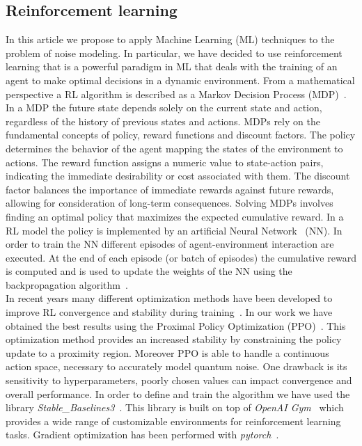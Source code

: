 \documentclass[sn-basic]{sn-jnl} %
\begin{document}
\subsection{Reinforcement learning}\label{sec_rl}
In this article we propose to apply Machine Learning (ML) techniques to the problem of noise modeling.
In particular, we have decided to use reinforcement learning that is a powerful paradigm in ML that deals with the training of an agent to make 
optimal decisions in a dynamic environment. From a mathematical perspective a RL algorithm is described as a Markov Decision Process (MDP)~\cite{PUTERMAN1990331}. 
In a MDP the future state depends solely on the current state and action, regardless of the history of previous states and actions. 
MDPs rely on the fundamental concepts of policy, reward functions and discount factors. 
The policy determines the behavior of the agent mapping the states of the environment to actions. 
The reward function assigns a numeric value to state-action pairs, indicating the immediate desirability or cost associated with them. 
The discount factor balances the importance of immediate rewards against future rewards, allowing for consideration of long-term consequences. 
Solving MDPs involves finding an optimal policy that maximizes the expected cumulative reward.
In a RL model the policy is implemented by an artificial Neural Network~\cite{Zou2009} (NN). 
In order to train the NN different episodes of agent-environment interaction are executed. 
At the end of each episode (or batch of episodes) the cumulative reward is computed and is used to update the weights of the NN using the backpropagation 
algorithm~\cite{Rojas1996}.\\
In recent years many different optimization methods have been developed to improve RL convergence and stability during training~\cite{ozalp2020}. 
In our work we have obtained the best results using the Proximal Policy Optimization (PPO)~\cite{schulman2017proximal}. 
This optimization method provides an increased stability by constraining the policy update to a proximity region. 
Moreover PPO is able to handle a continuous action space, necessary to accurately model quantum noise. 
One drawback is its sensitivity to hyperparameters, poorly chosen values can impact convergence and overall performance. 
In order to define and train the algorithm we have used the library \textit{Stable\_Baselines3}~\cite{JMLR:v22:20-1364}. 
This library is built on top of \textit{OpenAI Gym}~\cite{article_gym} which provides a wide range of customizable environments for reinforcement 
learning tasks. Gradient optimization has been performed with \textit{pytorch}~\cite{NEURIPS2019_9015}.
\end{document}
